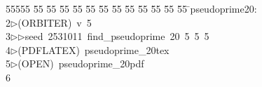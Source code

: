 %
%
\begin{tabbing}
55555 \= 55 \= 55 \= 55 \= 55 \= 55 \= 55 \= 55 \= 55 \= 55 \= 55 \= 55 \= 55 \= \>pseudoprime20:\\[0pt]
2\>$\triangleright$\>(ORBITER)\ v\ 5\ \\[0pt]
3\>$\triangleright$\>$\triangleright$\>seed\ 2531011\ find\_pseudoprime\ 20\ 5\ 5\ 5\ \\[0pt]
4\>$\triangleright$\>(PDFLATEX)\ pseudoprime\_20tex\\[0pt]
5\>$\triangleright$\>(OPEN)\ pseudoprime\_20pdf\\[0pt]
6\>\end{tabbing}
